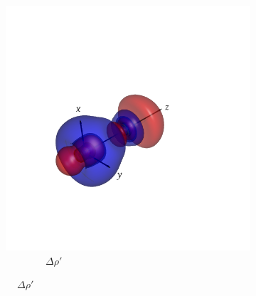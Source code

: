 \documentclass[journal=inoraj,manuscript=article]{achemso}
\begin{document}
\begin{figure}[!h]
    \centering
    \centering
    \begin{subfigure}[t]{0.33\textwidth}
        \centering
        \includegraphics[width=\linewidth]{./AuCn+/diff_tot.png} 
        \caption*{\ \ \ \ \ \ \ \ $\Delta \rho'$} 
    \end{subfigure}
    \hfill
 

\end{figure}
\end{document}
